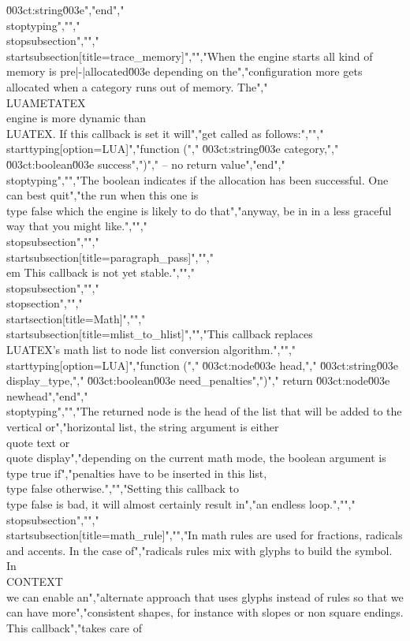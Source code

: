 \u003ct:string\u003e","end","\\stoptyping","","\\stopsubsection","","\\startsubsection[title=trace_memory]","","When the engine starts all kind of memory is pre|-|allocated\u003e depending on the","configuration more gets allocated when a category runs out of memory. The","\\LUAMETATEX\\ engine is more dynamic than \\LUATEX. If this callback is set it will","get called as follows:","","\\starttyping[option=LUA]","function (","    \u003ct:string\u003e  category,","    \u003ct:boolean\u003e success",")","    -- no return value","end","\\stoptyping","","The boolean indicates if the allocation has been successful. One can best quit","the run when this one is \\type {false} which the engine is likely to do that","anyway, be in in a less graceful way that you might like.","","\\stopsubsection","","\\startsubsection[title=paragraph_pass]","","{\\em This callback is not yet stable.}","","\\stopsubsection","","\\stopsection","","\\startsection[title=Math]","","\\startsubsection[title=mlist_to_hlist]","","This callback replaces \\LUATEX's math list to node list conversion algorithm.","","\\starttyping[option=LUA]","function (","    \u003ct:node\u003e    head,","    \u003ct:string\u003e  display_type,","    \u003ct:boolean\u003e need_penalties",")","    return \u003ct:node\u003e newhead","end","\\stoptyping","","The returned node is the head of the list that will be added to the vertical or","horizontal list, the string argument is either \\quote {text} or \\quote {display}","depending on the current math mode, the boolean argument is \\type {true} if","penalties have to be inserted in this list, \\type {false} otherwise.","","Setting this callback to \\type {false} is bad, it will almost certainly result in","an endless loop.","","\\stopsubsection","","\\startsubsection[title=math_rule]","","In math rules are used for fractions, radicals and accents. In the case of","radicals rules mix with glyphs to build the symbol. In \\CONTEXT\\ we can enable an","alternate approach that uses glyphs instead of rules so that we can have more","consistent shapes, for instance with slopes or non square endings. This callback","takes care of 